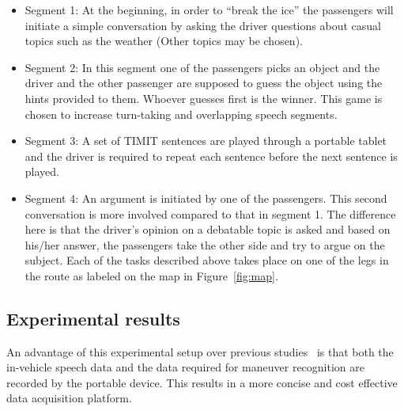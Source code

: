 \begin{itemize}
	
	\item Segment 1: At the beginning, in order to “break the ice” the passengers will initiate a simple conversation by asking the driver questions about casual topics such as the weather (Other topics may be chosen).
	\item Segment 2: In this segment one of the passengers picks an object and the driver and the other passenger are supposed to guess the object using the hints provided to them. Whoever guesses first is the winner. This game is chosen to increase turn-taking and overlapping speech segments.
	\item Segment 3: A set of TIMIT sentences are played through a portable tablet and the driver is required to repeat each sentence before the next sentence is played.
	\item Segment 4: An argument is initiated by one of the passengers. This second conversation is more involved compared to that in segment 1. The difference here is that the driver’s opinion on a debatable topic is asked and based on his/her answer, the passengers take the other side and try to argue on the subject.
	Each of the tasks described above takes place on one of the legs in the route as labeled on the map in Figure~\ref{fig:map}.
	
\end{itemize}




\subsection{Experimental results}
An advantage of this experimental setup over previous studies~\cite{sathyanarayanaITSC2012, sathyanarayanaSAE2013,ESPA} is that both the in-vehicle speech data and the data required for maneuver recognition are recorded by the portable device. 
This results in a more concise and cost effective data acquisition platform.

